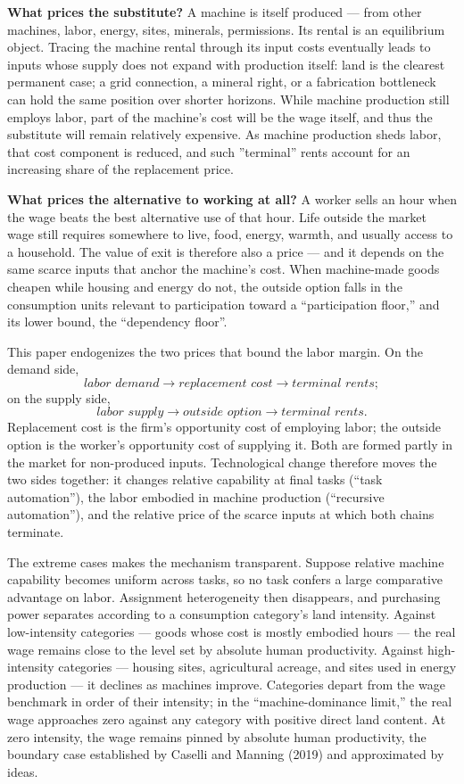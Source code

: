 \documentclass[12pt]{article}
\theoremstyle{plain}
\begin{document}
\textbf{What prices the substitute?} A machine is itself produced --- from other machines, labor, energy, sites, minerals, permissions. Its rental is an equilibrium object. Tracing the machine rental through its input costs eventually leads to inputs whose supply does not expand with production itself: land is the clearest permanent case; a grid connection, a mineral right, or a fabrication bottleneck can hold the same position over shorter horizons. While machine production still employs labor, part of the machine's cost will be the wage itself, and thus the substitute will remain relatively expensive. As machine production sheds labor, that cost component is reduced, and such ''terminal'' rents account for an increasing share of the replacement price.

\textbf{What prices the alternative to working at all?} A worker sells an hour when the wage beats the best alternative use of that hour. Life outside the market wage still requires somewhere to live, food, energy, warmth, and usually access to a household. The value of exit is therefore also a price --- and it depends on the same scarce inputs that anchor the machine's cost. When machine-made goods cheapen while housing and energy do not, the outside option falls in the consumption units relevant to participation toward a ``participation floor,'' and its lower bound, the ``dependency floor''.

This paper endogenizes the two prices that bound the labor margin. On the demand side,
\[
\textit{labor demand} \to \textit{replacement cost} \to \textit{terminal rents};
\]
on the supply side,
\[
\textit{labor supply} \to \textit{outside option} \to \textit{terminal rents}.
\]
Replacement cost is the firm's opportunity cost of employing labor; the outside option is the worker's opportunity cost of supplying it. Both are formed partly in the market for non-produced inputs. Technological change therefore moves the two sides together: it changes relative capability at final tasks (``task automation''), the labor embodied in machine production (``recursive automation''), and the relative price of the scarce inputs at which both chains terminate.

The extreme cases makes the mechanism transparent. Suppose relative machine capability becomes uniform across tasks, so no task confers a large comparative advantage on labor. Assignment heterogeneity then disappears, and purchasing power separates according to a consumption category's land intensity. Against low-intensity categories --- goods whose cost is mostly embodied hours --- the real wage remains close to the level set by absolute human productivity. Against high-intensity categories --- housing sites, agricultural acreage, and sites used in energy production --- it declines as machines improve. Categories depart from the wage benchmark in order of their intensity; in the ``machine-dominance limit,'' the real wage approaches zero against any category with positive direct land content. At zero intensity, the wage remains pinned by absolute human productivity, the boundary case established by Caselli and Manning (2019) and approximated by ideas.
\end{document}
